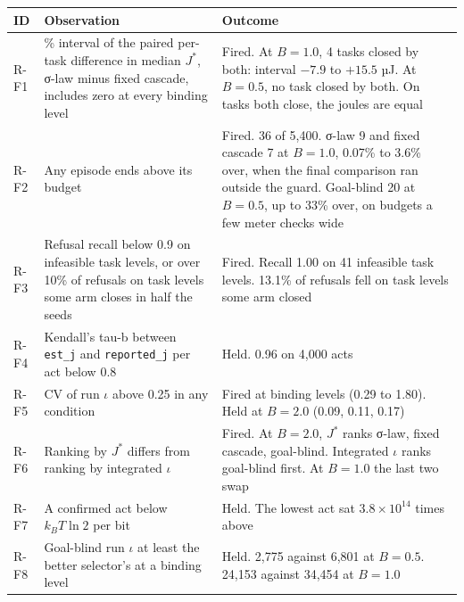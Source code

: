 \documentclass[
  10pt,
]{article}
\newcounter{none} %
\begin{document}
{\def\LTcaptype{none} %
\begin{longtable}[]{@{}
  >{\raggedright\arraybackslash}p{}
  >{\raggedright\arraybackslash}p{}
  >{\raggedright\arraybackslash}p{}@{}}
\toprule\noalign{}
\begin{minipage}[b]{\linewidth}\raggedright
ID
\end{minipage} & \begin{minipage}[b]{\linewidth}\raggedright
Observation
\end{minipage} & \begin{minipage}[b]{\linewidth}\raggedright
Outcome
\end{minipage} \\
\midrule\noalign{}
\endhead
\bottomrule\noalign{}
\endlastfoot
R-F1 & 95\% interval of the paired per-task difference in median
\(J^*\), σ-law minus fixed cascade, includes zero at every binding level
& Fired. At \(B = 1.0\), 4 tasks closed by both: interval \(-7.9\) to
\(+15.5\) µJ. At \(B = 0.5\), no task closed by both. On tasks both
close, the joules are equal \\
R-F2 & Any episode ends above its budget & Fired. 36 of 5,400. σ-law 9
and fixed cascade 7 at \(B = 1.0\), 0.07\% to 3.6\% over, when the final
comparison ran outside the guard. Goal-blind 20 at \(B = 0.5\), up to
33\% over, on budgets a few meter checks wide \\
R-F3 & Refusal recall below 0.9 on infeasible task levels, or over 10\%
of refusals on task levels some arm closes in half the seeds & Fired.
Recall 1.00 on 41 infeasible task levels. 13.1\% of refusals fell on
task levels some arm closed \\
R-F4 & Kendall's tau-b between \texttt{est\_j} and \texttt{reported\_j}
per act below 0.8 & Held. 0.96 on 4,000 acts \\
R-F5 & CV of run \(\iota\) above 0.25 in any condition & Fired at
binding levels (0.29 to 1.80). Held at \(B = 2.0\) (0.09, 0.11, 0.17) \\
R-F6 & Ranking by \(J^*\) differs from ranking by integrated \(\iota\) &
Fired. At \(B = 2.0\), \(J^*\) ranks σ-law, fixed cascade, goal-blind.
Integrated \(\iota\) ranks goal-blind first. At \(B = 1.0\) the last two
swap \\
R-F7 & A confirmed act below \(k_B T\ln 2\) per bit & Held. The lowest
act sat \(3.8 \times 10^{14}\) times above \\
R-F8 & Goal-blind run \(\iota\) at least the better selector's at a
binding level & Held. 2,775 against 6,801 at \(B = 0.5\). 24,153 against
34,454 at \(B = 1.0\) \\
\end{longtable}
}
\end{document}
